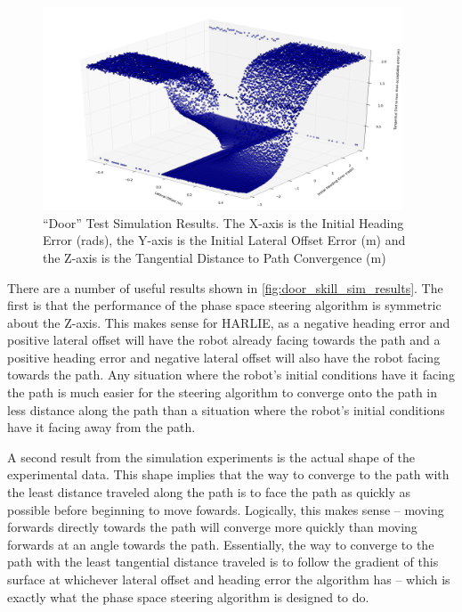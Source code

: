 \begin{figure}
\centering
\includegraphics[width=0.95\textwidth]{images/acceptable_error_surface}
\caption[``Door'' Test Simulation Results]{``Door'' Test Simulation Results. The X-axis is the Initial Heading Error (rads), the Y-axis is the Initial Lateral Offset Error (m) and the Z-axis is the Tangential Distance to Path Convergence (m)}
\label{fig:door_skill_sim_results}
\end{figure}

There are a number of useful results shown in \autoref{fig:door_skill_sim_results}. The first is that the performance of the phase space steering algorithm is symmetric about the Z-axis. This makes sense for HARLIE, as a negative heading error and positive lateral offset will have the robot already facing towards the path and a positive heading error and negative lateral offset will also have the robot facing towards the path. Any situation where the robot's initial conditions have it facing the path is much easier for the steering algorithm to converge onto the path in less distance along the path than a situation where the robot's initial conditions have it facing away from the path.

A second result from the simulation experiments is the actual shape of the experimental data. This shape implies that the way to converge to the path with the least distance traveled along the path is to face the path as quickly as possible before beginning to move fowards. Logically, this makes sense -- moving forwards directly towards the path will converge more quickly than moving forwards at an angle towards the path. Essentially, the way to converge to the path with the least tangential distance traveled is to follow the gradient of this surface at whichever lateral offset and heading error the algorithm has -- which is exactly what the phase space steering algorithm is designed to do.

